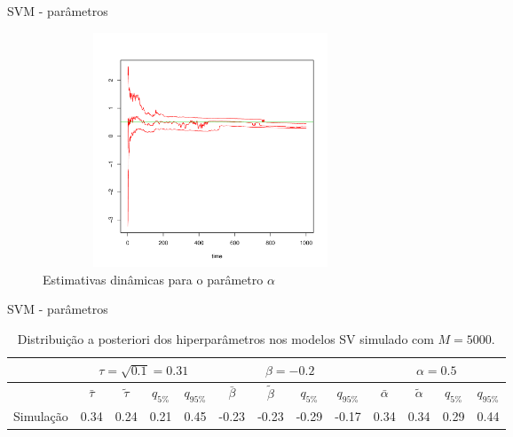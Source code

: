 \documentclass{beamer}
\begin{document}
 
 \begin{frame}{SVM - parâmetros}


 \begin{figure}
\begin{center}
 \includegraphics[height=7cm,width =10cm]{alpha_1_01_02_05.pdf}
 \end{center}
\caption{Estimativas dinâmicas para o parâmetro $\alpha$ } 
\end{figure}

 \end{frame}
 
 
 \begin{frame}{SVM - parâmetros}


\begin{table}[ht]
\centering
\tiny
\begin{tabular}{c|cccc|cccc|cccc}
 \hline
  \hline
 & \multicolumn{4}{c|}{$\tau=\sqrt{0.1}=0.31$} &  \multicolumn{4}{c|}{$\beta=-0.2$} &  \multicolumn{4}{c}{$\alpha=0.5$} \\
 \hline
  & $\bar{\tau}$ & $\tilde{\tau}$ & $q_{5\%}$ & $q_{95\%}$ & $\bar{\beta}$ & $\tilde{\beta}$ & $q_{5\%}$ & $q_{95\%}$ & $\bar{\alpha}$ & $\tilde{\alpha}$ & $q_{5\%}$ & $q_{95\%}$\\ 
  \hline
Simulação & 0.34 & 0.24 & 0.21 & 0.45 & -0.23 & -0.23 & -0.29 & -0.17 & 0.34 & 0.34 & 0.29 & 0.44 \\ 
   \hline
    \hline
\end{tabular}
\caption[\scriptsize{Distribuição a posteriori de $\tau$, $\beta$ e $\alpha$}]{\scriptsize{Distribuição a posteriori dos hiperparâmetros nos modelos SV simulado com $M=5000$.}}
\label{tab:hiperest1000simula}
\end{table}

\end{frame}
\end{document}

